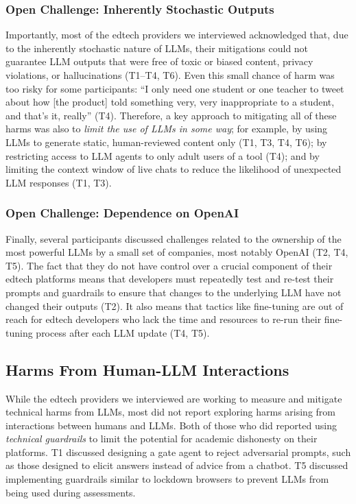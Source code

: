 \subsubsection*{Open Challenge: Inherently Stochastic Outputs} Importantly, most of the edtech providers we interviewed acknowledged that, due to the inherently stochastic nature of LLMs, their mitigations could not guarantee LLM outputs that were free of toxic or biased content, privacy violations, or hallucinations (T1--T4, T6). Even this small chance of harm was too risky for some participants: ``I only need one student or one teacher to tweet about how [the product] told something very, very inappropriate to a student, and that's it, really'' (T4). Therefore, a key approach to mitigating all of these harms was also to \textit{limit the use of LLMs in some way}; for example, by using LLMs to generate static, human-reviewed content only (T1, T3, T4, T6); by restricting access to LLM agents to only adult users of a tool (T4); and by limiting the context window of live chats to reduce the likelihood of unexpected LLM responses (T1, T3).

\subsubsection*{Open Challenge: Dependence on OpenAI}
Finally, several participants discussed challenges related to the ownership of the most powerful LLMs by a small set of companies, most notably OpenAI (T2, T4, T5). The fact that they do not have control over a crucial component of their edtech platforms means that developers must repeatedly test and re-test their prompts and guardrails to ensure that changes to the underlying LLM have not changed their outputs (T2). It also means that tactics like fine-tuning are out of reach for edtech developers who lack the time and resources to re-run their fine-tuning process after each LLM update (T4, T5). 

\subsection{Harms From Human-LLM Interactions}\label{s-results-interaction-harms-edtech}
While the edtech providers we interviewed are working to measure and mitigate technical harms from LLMs, most did not report exploring harms arising from interactions between humans and LLMs. Both of those who did reported using \textit{technical guardrails} to limit the potential for academic dishonesty on their platforms. T1 discussed designing a gate agent to reject adversarial prompts, such as those designed to elicit answers instead of advice from a chatbot. T5 discussed implementing guardrails similar to lockdown browsers to prevent LLMs from being used during assessments.

